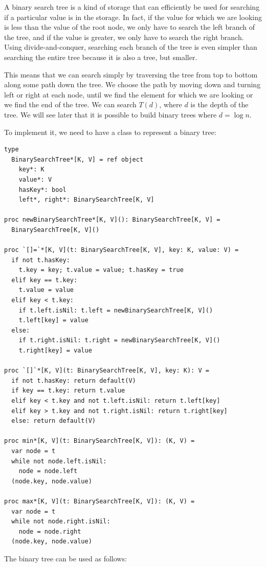 \documentclass[justified, sixbynine]{tufte-book}
\theoremstyle{plain}%
\newtheorem * {corollary}{Corollary}
\theoremstyle{definition}
\theoremstyle{remark}
\newtheorem * {remark}{Remark}
\newtheorem * {note}{Note}
\begin{document}
\begin{fullwidth}
A binary search tree is a kind of storage that can efficiently be used for searching if a particular value is in the storage. In fact, if the value for which we are looking is less than the value of the root node, we only have to search the left branch of the tree, and if the value is greater, we only have to search the right branch. Using divide-and-conquer, searching each branch of the tree is even simpler than searching the entire tree because it is also a tree, but smaller.

This means that we can search simply by traversing the tree from top to bottom along some path down the tree. We choose the path by moving down and turning left or right at each node, until we find the element for which we are looking or we find the end of the tree. We can search $T(d)$, where $d$ is the depth of the tree. We will see later that it is possible to build binary trees where $d=\log n$.

To implement it, we need to have a class to represent a binary tree:

\begin{lstlisting}
type
  BinarySearchTree*[K, V] = ref object
    key*: K
    value*: V
    hasKey*: bool
    left*, right*: BinarySearchTree[K, V]

proc newBinarySearchTree*[K, V](): BinarySearchTree[K, V] =
  BinarySearchTree[K, V]()

proc `[]=`*[K, V](t: BinarySearchTree[K, V], key: K, value: V) =
  if not t.hasKey:
    t.key = key; t.value = value; t.hasKey = true
  elif key == t.key:
    t.value = value
  elif key < t.key:
    if t.left.isNil: t.left = newBinarySearchTree[K, V]()
    t.left[key] = value
  else:
    if t.right.isNil: t.right = newBinarySearchTree[K, V]()
    t.right[key] = value

proc `[]`*[K, V](t: BinarySearchTree[K, V], key: K): V =
  if not t.hasKey: return default(V)
  if key == t.key: return t.value
  elif key < t.key and not t.left.isNil: return t.left[key]
  elif key > t.key and not t.right.isNil: return t.right[key]
  else: return default(V)

proc min*[K, V](t: BinarySearchTree[K, V]): (K, V) =
  var node = t
  while not node.left.isNil:
    node = node.left
  (node.key, node.value)

proc max*[K, V](t: BinarySearchTree[K, V]): (K, V) =
  var node = t
  while not node.right.isNil:
    node = node.right
  (node.key, node.value)
\end{lstlisting}

The binary tree can be used as follows:


\end{fullwidth}
\end{document}
